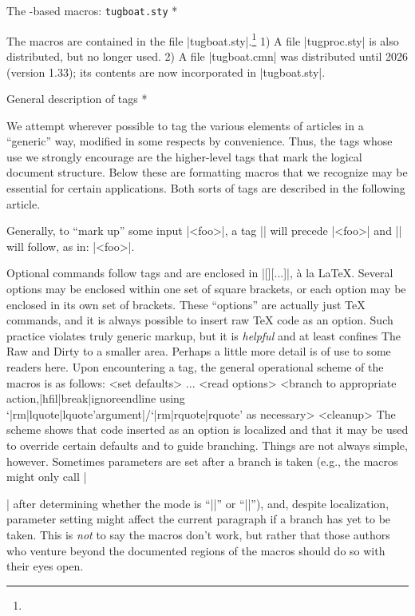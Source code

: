 \head * The \plain-based macros: {\tt tugboat.sty} *

The macros are contained in the file |tugboat.sty|.\footnote{}{%
1) A file |tugproc.sty| is also distributed, but no longer used.
2) A file |tugboat.cmn| was distributed until 2026 (version 1.33); its
contents are now incorporated in |tugboat.sty|.}

\subhead * General description of tags *

We attempt wherever possible to tag the various elements of \TUB\/
articles in a ``generic'' way, modified in some respects by convenience.
Thus, the tags whose use we strongly encourage are the higher-level tags
that mark the logical document structure. Below these are formatting
macros that we recognize may be essential for certain applications. Both
sorts of tags are described in the following article.

Generally, to ``mark up'' some input |<foo>|, a tag |\xxx| will precede
|<foo>| and |\endxxx| will follow, as in: |\xxx <foo>\endxxx|.

Optional commands follow tags and are enclosed in
|[\lastoption][...]|, \`a la \LaTeX.  Several options may be enclosed
within one set of square brackets, or each
option may be enclosed in its own set of brackets.  These ``options''
are actually just \TeX{} commands, and it is always possible to
insert raw \TeX{} code as an option.  Such practice violates truly
generic markup, but it is {\it helpful\/} and at least confines
The Raw and Dirty to a smaller area.
\subtext
Perhaps a little more detail is of use to some readers here.
Upon encountering a tag, the general operational scheme of the
macros is as follows:
\begingroup
<set defaults>
\the\every...
<read options>
<branch to appropriate action,|hfil|break|ignoreendline
using `|rm|lquote|lquote'argument|/`|rm|rquote|rquote' as necessary>
<cleanup>
\endgroup
\endverbatim
The scheme shows that code inserted as an option is localized and that
it may be used to override certain defaults and to guide branching.
Things are not always simple, however.  Sometimes parameters are set
after a branch is taken (e.g., the macros might only call |\raggedright|
after determining whether the mode is ``|\inline|'' or
``|\display|''), and, despite localization, parameter setting might
affect the current paragraph if a branch has yet to be taken.
This is {\it not\/} to say the macros don't work, but rather that
those authors who venture beyond the documented regions of the
macros should do so with their eyes open.
\endtext

